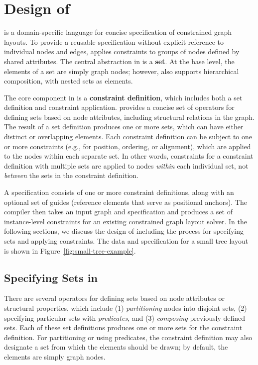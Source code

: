 \section{Design of \projectname}
\projectname is a domain-specific language for concise specification of 
constrained graph layouts. To provide a reusable specification 
without explicit reference to individual nodes and edges, \projectname
applies constraints to groups of nodes defined by shared attributes. 
The central abstraction in \projectname is a \textbf{set}. At the base level, 
the elements of a set are simply graph nodes; however, \projectname also
supports hierarchical composition, with nested sets as elements.

The core component in \projectname is a \textbf{constraint definition},
which includes both a set definition and constraint application.
\projectname provides a concise set of operators for defining
sets based on node attributes, including structural relations in the graph.
The result of a set definition produces one or more sets, which 
can have either distinct or overlapping elements. Each constraint definition can 
be subject to one or more constraints (e.g., for position, ordering, 
or alignment), which are applied to the nodes within each separate set. 
In other words, constraints for a constraint definition with multiple sets are 
applied to nodes \emph{within} each individual set, not \emph{between} 
the sets in the constraint definition.

A \projectname specification consists of one or more constraint definitions, 
along with an optional set of guides (reference elements that serve as 
positional anchors). The \projectname compiler then takes an input graph 
and specification and produces a set of instance-level constraints for 
an existing constrained graph layout solver. In the following sections, 
we discuss the design of \projectname including the process for 
specifying sets and applying constraints. The data and \projectname 
specification for a small tree layout is shown in Figure~\ref{fig:small-tree-example}.

\smallTreeExample

\subsection{Specifying Sets in \projectname}
There are several operators for defining sets based on node attributes 
or structural properties, which include (1) \emph{partitioning} nodes 
into disjoint sets, (2) specifying particular sets with \emph{predicates},
and (3) \emph{composing} previously defined sets. Each of these set
definitions produces one or more sets for the constraint definition. For
partitioning or using predicates, the constraint definition may also 
designate a set from which the elements should be drawn; by default, the
elements are simply graph nodes.


